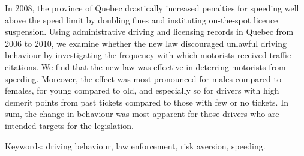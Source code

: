 

In 2008, the province of Quebec drastically increased penalties for speeding 
well above the speed limit by doubling fines and instituting on-the-spot licence suspension. 
Using administrative driving and licensing records in Quebec from 2006 to 2010, 
we examine whether the new law discouraged unlawful driving behaviour 
by investigating the frequency with which motorists received traffic citations. 
We find that the new law was effective in deterring motorists from speeding.
Moreover, the effect was most pronounced for males compared to females, 
for young compared to old, 
and especially so for drivers with high demerit points from past
tickets compared to those with few or no tickets. 
In sum, the change in behaviour was most apparent for 
those drivers who are intended targets for the legislation. 


\medskip
\noindent
Keywords: driving behaviour, law enforcement, risk aversion, speeding.
